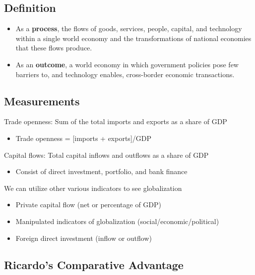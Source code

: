 \documentclass[
]{book}
\providecommand{\tightlist}{%
  \setlength{\itemsep}{0pt}\setlength{\parskip}{0pt}}
\begin{document}
\hypertarget{definition}{%
\subsection{Definition}\label{definition}}

\begin{itemize}
\item
  As a \textbf{process}, the flows of goods, services, people, capital, and technology within a single world economy and the
  transformations of national economies that these flows produce.
\item
  As an \textbf{outcome}, a world economy in which government policies pose few barriers to, and technology enables, cross-border economic transactions.
\end{itemize}

\hypertarget{measurements}{%
\subsection{Measurements}\label{measurements}}

Trade openness: Sum of the total imports and exports as a share of GDP

\begin{itemize}
\tightlist
\item
  Trade openness = {[}imports + exports{]}/GDP
\end{itemize}

Capital flows: Total capital inflows and outflows as a share of GDP

\begin{itemize}
\tightlist
\item
  Consist of direct investment, portfolio, and bank finance
\end{itemize}

We can utilize other various indicators to see globalization

\begin{itemize}
\item
  Private capital flow (net or percentage of GDP)
\item
  Manipulated indicators of globalization (social/economic/political)
\item
  Foreign direct investment (inflow or outflow)
\end{itemize}

\hypertarget{ricardos-comparative-advantage}{%
\subsection{Ricardo's Comparative Advantage}\label{ricardos-comparative-advantage}}
\end{document}
